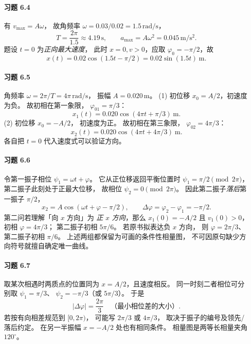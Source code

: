 \paragraph{习题 6.4}
有 \(v_{\max}=A\omega\)，
故角频率
\(\omega=0.03/0.02=1.5\,\mathrm{rad/s}\)，
\[
 \boxed{T=\frac{2\pi}{1.5}
 \approx4.19\,\mathrm s},\qquad
 \boxed{a_{\max}=A\omega^2
 =0.045\,\mathrm{m/s^2}}.
\]
题设 \(t=0\) 为\emph{正向最大速度}，
此时 \(x=0,v>0\)，应取
\(\varphi_0=-\pi/2\)，故
\[
 \boxed{x(t)=0.02\cos(1.5t-\pi/2)
 =0.02\sin(1.5t)\ \mathrm m}.
\]

\paragraph{习题 6.5}
角频率
\(\omega=2\pi/T=4\pi\,\mathrm{rad/s}\)，
振幅 \(A=0.020\,\mathrm m\)。
(1) 初位移
\(x_0=A/2\)，初速度为负。
故初相在第一象限，
\(\boxed{\varphi_{01}=\pi/3}\)：
\[
 \boxed{x_1(t)=0.020\cos(4\pi t+\pi/3)\ \mathrm m}.
\]
(2) 初位移 \(x_0=-A/2\)，
初速度为正。
故初相在第三象限，
\(\boxed{\varphi_{02}=4\pi/3}\)：
\[
 \boxed{x_2(t)=0.020\cos(4\pi t+4\pi/3)\ \mathrm m}.
\]
各自把 \(t=0\) 代入速度式可以验证方向。

\paragraph{习题 6.6}
令第一振子相位
\(\psi_1=\omega t+\varphi\)。
它从正位移返回平衡位置时
\(\psi_1=\pi/2\pmod{2\pi}\)，
第二振子此刻处于正最大位移，
故相位
\(\psi_2=0\pmod{2\pi}\)。
因此第二振子\emph{落后}第一振子
\(\pi/2\)，
\[
 \boxed{x_2=A\cos(\omega t+\varphi-\pi/2)},\qquad
 \boxed{\Delta\varphi=\varphi_2-\varphi_1=-\pi/2}.
\]
第二问若理解「向 \(x\) 方向」为
\emph{正 \(x\) 方向}，那么
\(x_1(0)=-A/2\) 且 \(v_1(0)>0\)，
初相 \(\varphi=4\pi/3\)；
第二振子初相 \(5\pi/6\)。
若原书拟表达负 \(x\) 方向，
则 \(\varphi=2\pi/3\)、
第二振子初相 \(\pi/6\)。
上述两组都保留为可画的条件性相量图，
不可因原句缺少方向符号就擅自确定唯一曲线。

\paragraph{习题 6.7}
取某次相遇时两质点的位置同为
\(x=A/2\)，且速度相反。
同一时刻二者相位可分别取
\(\psi_1=\pi/3\)、
\(\psi_2=-\pi/3\)（或 \(5\pi/3\)）。
于是
\[
 \boxed{|\Delta\varphi|=\frac{2\pi}{3}
 \quad\text{（最小相位差的大小）}}.
\]
若按有向相差规范到 \([0,2\pi)\)，
可能写 \(2\pi/3\) 或 \(4\pi/3\)，
取决于振子的编号及领先/落后约定。
在另一半振幅 \(x=-A/2\) 处也有相同条件。
相量图是两等长相量夹角 \(120^\circ\)。

